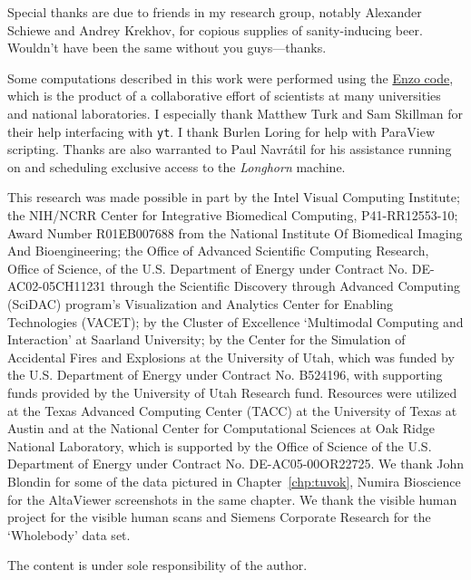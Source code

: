 Special thanks are due to friends in my research group, notably
Alexander Schiewe and Andrey Krekhov, for copious supplies of
sanity-inducing beer.  Wouldn't have been the same without you
guys---thanks.

Some computations described in this work were performed using the
\href{http://enzo-project.org}{Enzo code}, which is the product of a
collaborative effort of scientists at many universities and national
laboratories.  I especially thank Matthew Turk and Sam Skillman for
their help interfacing with \texttt{yt}.  I thank Burlen Loring for
help with ParaView scripting.  Thanks are also warranted to Paul
Navr\'{a}til for his assistance running on and scheduling exclusive
access to the
\textit{Longhorn} machine.

This research was made possible in part by the Intel Visual
Computing Institute; the NIH/NCRR Center for Integrative Biomedical
Computing, P41-RR12553-10; Award Number R01EB007688 from the National
Institute Of Biomedical Imaging And Bioengineering; the Office of
Advanced Scientific Computing Research, Office of Science, of the
U.S. Department of Energy under Contract No. DE-AC02-05CH11231
through the Scientific Discovery through Advanced Computing (SciDAC)
program's Visualization and Analytics Center for Enabling Technologies
(VACET); by the Cluster of Excellence `Multimodal Computing and
Interaction' at Saarland University; by the Center for the Simulation
of Accidental Fires and Explosions at the University of Utah, which was
funded by the U.S. Department of Energy under Contract No. B524196,
with supporting funds provided by the University of Utah Research
fund. Resources were utilized at the Texas Advanced Computing Center
(TACC) at the University of Texas at Austin and at the National Center
for Computational Sciences at Oak Ridge National Laboratory, which is
supported by the Office of Science of the U.S. Department of Energy
under Contract No. DE-AC05-00OR22725.  We thank John Blondin for some
of the
data pictured in Chapter~\ref{chp:tuvok}, Numira Bioscience for the
AltaViewer screenshots in the same chapter.  We thank the visible human
project for the visible human scans and Siemens Corporate Research for
the `Wholebody' data set.

The content is under sole responsibility of the author.
